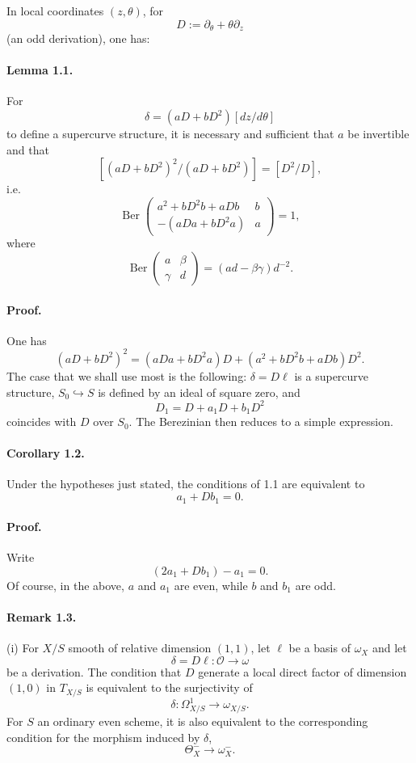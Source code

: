 \documentclass[11pt]{article}
\newcommand{\cO}{\mathcal O}
\newcommand{\Ber}{\operatorname{Ber}}
\begin{document}
In local coordinates $(z,\theta)$, for
\[
  D:=\partial_\theta+\theta\partial_z
\]
(an odd derivation), one has:

\paragraph{Lemma 1.1.}
For
\[
  \delta=(aD+bD^2)[dz/d\theta]
\]
to define a supercurve structure, it is necessary and sufficient that $a$ be invertible and that
\[
  [(aD+bD^2)^2/(aD+bD^2)]=[D^2/D],
\]
i.e.
\begin{equation}\tag{1.1.1}
  \Ber\begin{pmatrix}
    a^2+bD^2b+aDb & b\\
    -(aDa+bD^2a) & a
  \end{pmatrix}=1,
\end{equation}
where
\[
  \Ber\begin{pmatrix}a&\beta\\ \gamma&d\end{pmatrix}
   =(ad-\beta\gamma)d^{-2}.
\]

\paragraph{Proof.}
One has
\[
  (aD+bD^2)^2=(aDa+bD^2a)D+(a^2+bD^2b+aDb)D^2.
\]
The case that we shall use most is the following: $\delta=D\ell$ is a supercurve structure, $S_0\hookrightarrow S$ is defined by an ideal of square zero, and
\[
  D_1=D+a_1D+b_1D^2
\]
coincides with $D$ over $S_0$. The Berezinian then reduces to a simple expression.

\paragraph{Corollary 1.2.}
Under the hypotheses just stated, the conditions of 1.1 are equivalent to
\begin{equation}\tag{1.2.1}
  a_1+Db_1=0.
\end{equation}

\paragraph{Proof.}
Write
\[
  (2a_1+Db_1)-a_1=0.
\]
Of course, in the above, $a$ and $a_1$ are even, while $b$ and $b_1$ are odd.

\paragraph{Remark 1.3.}
(i) For $X/S$ smooth of relative dimension $(1,1)$, let $\ell$ be a basis of $\omega_X$ and let
\[
  \delta=D\ell:\cO\longrightarrow\omega
\]
be a derivation. The condition that $D$ generate a local direct factor of dimension $(1,0)$ in $T_{X/S}$ is equivalent to the surjectivity of
\[
  \delta:\Omega^1_{X/S}\longrightarrow\omega_{X/S}.
\]
For $S$ an ordinary even scheme, it is also equivalent to the corresponding condition for the morphism induced by $\delta$,
\[
  \Theta_X^-\longrightarrow\omega_X^-.
\]
\end{document}

